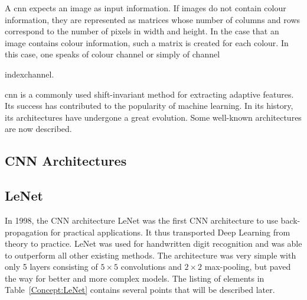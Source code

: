 A \ac{cnn} expects an image as input information. If images do not contain colour information, they are represented as matrices whose number of columns and rows correspond to the number of pixels in width and height. In the case that an image contains colour information, such a matrix is created for each colour. In this case, one speaks of colour channel or simply of channel{index{channel}.
	
	
\ac{cnn} is a commonly used shift-invariant method for extracting adaptive features. Its success has contributed to the popularity of machine learning. In its history, its architectures have undergone a great evolution. Some well-known architectures are now described.    
	
\subsection{CNN Architectures}


\subsection{LeNet}

In 1998, the CNN architecture LeNet was the first CNN architecture to use back-propagation for practical applications. It thus transported Deep Learning from theory to practice. LeNet was used for handwritten digit recognition and was able to outperform all other existing methods. The architecture was very simple with only 5 layers consisting of $5\times 5$ convolutions and $2\times 2$ max-pooling, but paved the way for better and more complex models. \cite{LeCun:1998} The listing of elements in Table~\ref{Concept:LeNet} contains several points that will be described later.





}
